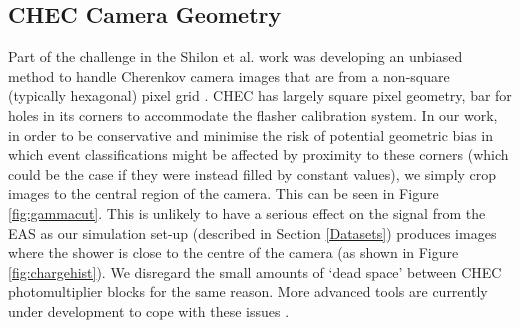 \begin{table}[ht]
    \centering
    \caption{Summary of methods used. The ordering of input channels into the ConvLSTM2D networks is as presented in this table. The number of trainable parameters is also shown, highlighting the effect of using a different number of channels in method B.}
    \label{table:methods}
\end{table}
\subsection{CHEC Camera Geometry}
Part of the challenge in the Shilon et al. work \cite{Shilon} was developing an unbiased method to handle Cherenkov camera images that are from a non-square (typically hexagonal) pixel grid \cite{Hexagdly}.  CHEC has largely square pixel geometry, bar for holes in its corners to accommodate the flasher calibration system. In our work, in order to be conservative and minimise the risk of potential geometric bias in which event classifications might be affected by proximity to these corners (which could be the case if they were instead filled by constant values), we simply crop images to the central region of the camera. This can be seen in Figure \ref{fig:gammacut}. This is unlikely to have a serious effect on the signal from the EAS as our simulation set-up (described in Section \ref{Datasets}) produces images where the shower is close to the centre of the camera (as shown in Figure \ref{fig:chargehist}). We disregard the small amounts of `dead space' between CHEC photomultiplier blocks for the same reason. More advanced tools are currently under development to cope with these issues \cite{dl1dh,thomas}.

